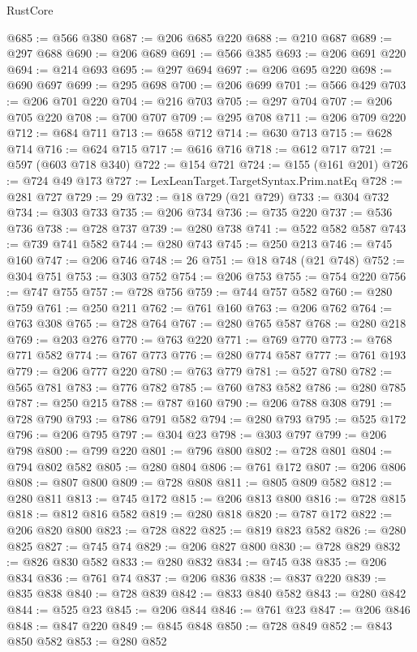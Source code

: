 \begin{lexlean}{RustCore}
\begin{coremodule}
@685 := @566 @380
@687 := @206 @685 @220
@688 := @210 @687
@689 := @297 @688
@690 := @206 @689
@691 := @566 @385
@693 := @206 @691 @220
@694 := @214 @693
@695 := @297 @694
@697 := @206 @695 @220
@698 := @690 @697
@699 := @295 @698
@700 := @206 @699
@701 := @566 @429
@703 := @206 @701 @220
@704 := @216 @703
@705 := @297 @704
@707 := @206 @705 @220
@708 := @700 @707
@709 := @295 @708
@711 := @206 @709 @220
@712 := @684 @711
@713 := @658 @712
@714 := @630 @713
@715 := @628 @714
@716 := @624 @715
@717 := @616 @716
@718 := @612 @717
@721 := @597 (@603 @718 @340)
@722 := @154 @721
@724 := @155 (@161 @201)
@726 := @724 @49 @173
@727 := LexLeanTarget.TargetSyntax.Prim.natEq
@728 := @281 @727
@729 := 29
@732 := @18 @729 (@21 @729)
@733 := @304 @732
@734 := @303 @733
@735 := @206 @734
@736 := @735 @220
@737 := @536 @736
@738 := @728 @737
@739 := @280 @738
@741 := @522 @582 @587
@743 := @739 @741 @582
@744 := @280 @743
@745 := @250 @213
@746 := @745 @160
@747 := @206 @746
@748 := 26
@751 := @18 @748 (@21 @748)
@752 := @304 @751
@753 := @303 @752
@754 := @206 @753
@755 := @754 @220
@756 := @747 @755
@757 := @728 @756
@759 := @744 @757 @582
@760 := @280 @759
@761 := @250 @211
@762 := @761 @160
@763 := @206 @762
@764 := @763 @308
@765 := @728 @764
@767 := @280 @765 @587
@768 := @280 @218
@769 := @203 @276
@770 := @763 @220
@771 := @769 @770
@773 := @768 @771 @582
@774 := @767 @773
@776 := @280 @774 @587
@777 := @761 @193
@779 := @206 @777 @220
@780 := @763 @779
@781 := @527 @780
@782 := @565 @781
@783 := @776 @782
@785 := @760 @783 @582
@786 := @280 @785
@787 := @250 @215
@788 := @787 @160
@790 := @206 @788 @308
@791 := @728 @790
@793 := @786 @791 @582
@794 := @280 @793
@795 := @525 @172
@796 := @206 @795
@797 := @304 @23
@798 := @303 @797
@799 := @206 @798
@800 := @799 @220
@801 := @796 @800
@802 := @728 @801
@804 := @794 @802 @582
@805 := @280 @804
@806 := @761 @172
@807 := @206 @806
@808 := @807 @800
@809 := @728 @808
@811 := @805 @809 @582
@812 := @280 @811
@813 := @745 @172
@815 := @206 @813 @800
@816 := @728 @815
@818 := @812 @816 @582
@819 := @280 @818
@820 := @787 @172
@822 := @206 @820 @800
@823 := @728 @822
@825 := @819 @823 @582
@826 := @280 @825
@827 := @745 @74
@829 := @206 @827 @800
@830 := @728 @829
@832 := @826 @830 @582
@833 := @280 @832
@834 := @745 @38
@835 := @206 @834
@836 := @761 @74
@837 := @206 @836
@838 := @837 @220
@839 := @835 @838
@840 := @728 @839
@842 := @833 @840 @582
@843 := @280 @842
@844 := @525 @23
@845 := @206 @844
@846 := @761 @23
@847 := @206 @846
@848 := @847 @220
@849 := @845 @848
@850 := @728 @849
@852 := @843 @850 @582
@853 := @280 @852

\end{coremodule}
\end{lexlean}
